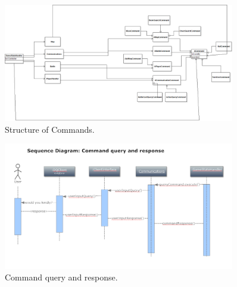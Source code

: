 \begin{figure}[]
\center
\includegraphics[width=0.9\textwidth] {diagrams/CommandStructureDiagram.png}
\caption{Structure of Commands.}
\label{commandstructure}
\end{figure}

\begin{figure}[]
\center
\includegraphics[width=0.9\textwidth] {diagrams/moveCommandSequenceDiagram.png}
\caption{Command query and response.}
\label{commandsequence}
\end{figure}


